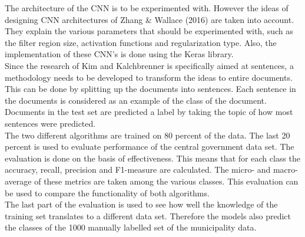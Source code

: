 \documentclass[a4paper]{article}
\begin{document}
The architecture of the CNN is to be experimented with. However the ideas of designing CNN architectures of Zhang & Wallace (2016) are taken into account. They explain the various parameters that should be experimented with, such as the filter region size, activation functions and regularization type. Also, the implementation of these CNN's is done using the Keras library. \cite{zhang2015sensitivity}\\
Since the research of Kim and Kalchbrenner is specifically aimed at sentences, a methodology needs to be developed to transform the ideas to entire documents. This can be done by splitting up the documents into sentences. Each sentence in the documents is considered as an example of the class of the document. Documents in the test set are predicted a label by taking the topic of how most sentences were predicted.\\  
The two different algorithms are trained on 80 percent of the data. The last 20 percent is used to evaluate performance of the central government data set. The evaluation is done on the basis of effectiveness. This means that for each class the accuracy, recall, precision and F1-measure are calculated. The micro- and macro-average of these metrics are taken among the various classes. This evaluation can be used to compare the functionality of both algorithms. \cite{manning2008introduction}\\
The last part of the evaluation is used to see how well the knowledge of the training set translates to a different data set. Therefore the models also predict the classes of the 1000 manually labelled set of the municipality data.

\end{document}
